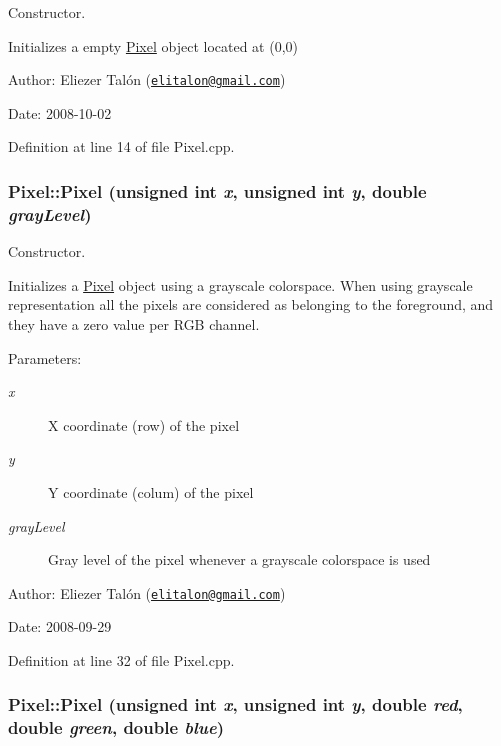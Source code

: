 Constructor. 

Initializes a empty \hyperlink{class_pixel}{Pixel} object located at (0,0)

\begin{Desc}
\item[Author:]Eliezer Talón (\href{mailto:elitalon@gmail.com}{\tt elitalon@gmail.com}) \end{Desc}
\begin{Desc}
\item[Date:]2008-10-02 \end{Desc}


Definition at line 14 of file Pixel.cpp.\hypertarget{class_pixel_dfa33daefa83d3ac471af91fb32f8997}{
\subsubsection[Pixel]{\setlength{\rightskip}{0pt plus 5cm}Pixel::Pixel (unsigned int {\em x}, \/  unsigned int {\em y}, \/  double {\em grayLevel})}}
\label{class_pixel_dfa33daefa83d3ac471af91fb32f8997}


Constructor. 

Initializes a \hyperlink{class_pixel}{Pixel} object using a grayscale colorspace. When using grayscale representation all the pixels are considered as belonging to the foreground, and they have a zero value per RGB channel.

\begin{Desc}
\item[Parameters:]
\begin{description}
\item[{\em x}]X coordinate (row) of the pixel \item[{\em y}]Y coordinate (colum) of the pixel \item[{\em grayLevel}]Gray level of the pixel whenever a grayscale colorspace is used\end{description}
\end{Desc}
\begin{Desc}
\item[Author:]Eliezer Talón (\href{mailto:elitalon@gmail.com}{\tt elitalon@gmail.com}) \end{Desc}
\begin{Desc}
\item[Date:]2008-09-29 \end{Desc}


Definition at line 32 of file Pixel.cpp.\hypertarget{class_pixel_e5ca1376e87442aea5968a17a4240814}{
\subsubsection[Pixel]{\setlength{\rightskip}{0pt plus 5cm}Pixel::Pixel (unsigned int {\em x}, \/  unsigned int {\em y}, \/  double {\em red}, \/  double {\em green}, \/  double {\em blue})}}
\label{class_pixel_e5ca1376e87442aea5968a17a4240814}


